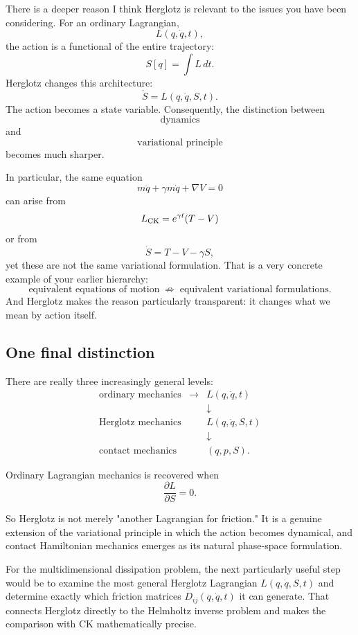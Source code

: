 There is a deeper reason I think Herglotz is relevant to the issues you have been considering. For an ordinary Lagrangian, $$ L(q,\dot q,t), $$
the action is a functional of the entire trajectory:
$$ S[q]=\int L\,dt. $$
Herglotz changes this architecture:
$$ \boxed{ \dot S=L(q,\dot q,S,t). } $$
The action becomes a state variable.
Consequently, the distinction between
$$ \text{dynamics} $$
and
$$ \text{variational principle} $$
becomes much sharper.

In particular, the same equation
$$ m\ddot q+\gamma m\dot q+\nabla V=0 $$
can arise from
$$ L_{\rm CK}=e^{\gamma t}(T-V) $$
or from
$$ \dot S=T-V-\gamma S, $$
yet these are not the same variational formulation.
That is a very concrete example of your earlier hierarchy:
$$ \boxed{ \text{equivalent equations of motion} \;\not\Rightarrow\; \text{equivalent variational formulations}. } $$
And Herglotz makes the reason particularly transparent: it changes what we mean by action itself.

\subsection{One final distinction}

There are really three increasingly general levels:
$$ \boxed{ 
\begin{array}{ccc} 
\text{ordinary mechanics} & \longrightarrow& L(q,\dot q,t) \\[2mm]
&&\downarrow\\[-1mm]
\text{Herglotz mechanics} && L(q,\dot q,S,t) \\[2mm]
&&\downarrow\\[-1mm]
\text{contact mechanics} && (q,p,S). 
\end{array}} $$

Ordinary Lagrangian mechanics is recovered when
$$ \frac{\partial L}{\partial S}=0. $$

So Herglotz is not merely "another Lagrangian for friction." It is a genuine extension of the variational principle in which the action becomes dynamical, and contact Hamiltonian mechanics emerges as its natural phase-space formulation.

For the multidimensional dissipation problem, the next particularly useful step would be to examine the most general Herglotz Lagrangian \(L(q,\dot q,S,t)\) and determine exactly which friction matrices \(D_{ij}(q,\dot q,t)\) it can generate. That connects Herglotz directly to the Helmholtz inverse problem and makes the comparison with CK mathematically precise.

